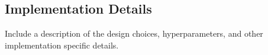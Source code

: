 \subsection{Implementation Details}
Include a description of the design choices, hyperparameters, and other implementation specific details.

